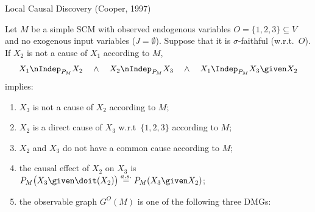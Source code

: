 \begin{frame}{Local Causal Discovery (Cooper, 1997)}
\begin{Prp}
  Let $M$ be a simple SCM with observed endogenous variables $O = \{1,2,3\} \subseteq V$ and no exogenous input variables ($J=\emptyset$).
  Suppose that it is $\sigma$-faithful (w.r.t.\ $O$). 
  If $X_2$ is not a cause of $X_1$ according to $M$, 
  $$X_1 \nIndep_{P_M} X_2 \quad \land \quad X_2 \nIndep_{P_M} X_3 \quad \land \quad X_1 \Indep_{P_M} X_3 \given X_2$$
  implies:
  \begin{enumerate}
  \item $X_3$ is not a cause of $X_2$ according to $M$;
  \item $X_2$ is a direct cause of $X_3$ w.r.t\ $\{1,2,3\}$ according to $M$;
  \item $X_2$ and $X_3$ do not have a common cause according to $M$;
  \item the causal effect of $X_2$ on $X_3$ is $P_{M}\big(X_3 \given \doit(X_2)\big) \stackrel{a.s.}{=} P_{M}(X_3 \given X_2)$;
  \item the observable graph $G^O(M)$ is one of the following three DMGs:\\[0.5\baselineskip]
  \end{enumerate}
\end{Prp}
\end{frame}

